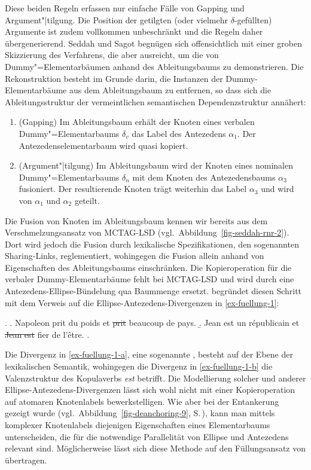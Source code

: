 Diese beiden Regeln erfassen nur einfache Fälle von Gapping und Argument"|tilgung. Die Position der getilgten (oder vielmehr $\delta$-gefüllten) Argumente ist zudem vollkommen unbeschränkt und die Regeln daher übergenerierend. Seddah und Sagot begnügen sich offensichtlich mit einer groben Skizzierung des Verfahrens, die aber ausreicht, um die  von Dummy"=Elementarbäumen anhand des Ableitungsbaums zu demonstrieren. Die Rekonstruktion besteht im Grunde darin, die Instanzen der Dummy-Elementarbäume aus dem Ableitungsbaum zu entfernen, so dass sich die Ableitungsstruktur der vermeintlichen semantischen Dependenzstruktur annähert:\newpage
\begin{enumerate}
  \item (Gapping) Im Ableitungsbaum erhält der Knoten eines verbalen Dummy"=Elementarbaums $\delta_v$ das Label des Antezedens $\alpha_1$. Der Antezedenselementarbaum wird quasi kopiert.
  \item (Argument"|tilgung) Im Ableitungsbaum wird der Knoten eines nominalen Dummy"=Elementarbaums $\delta_n$ mit dem Knoten des Antezedensbaums $\alpha_3$ fusioniert. Der resultierende Knoten trägt weiterhin das Label $\alpha_3$ und wird von $\alpha_1$ und $\alpha_2$ geteilt.
\end{enumerate}
Die Fusion von Knoten im Ableitungsbaum kennen wir bereits aus dem Verschmelzungsansatz von MCTAG-LSD (vgl.\ Abbildung~\ref{fig-seddah-rnr-2}). Dort wird jedoch die Fusion durch lexikalische Spezifikationen, den sogenannten Sharing-Links, reglementiert, wohingegen \cite{Seddah:Sagot:06} die Fusion allein anhand von Eigenschaften des Ableitungsbaums einschränken. Die Kopieroperation für die  verbaler Dummy-Elementarbäume fehlt bei MCTAG-LSD und wird durch eine Antezedens-Ellipse-Bündelung qua Baummenge ersetzt. \cite{Seddah:08} begründet diesen Schritt mit dem Verweis auf die Ellipse-Antezedens-Divergenzen in \ref{ex-fuellung-1}: 

\ex. \label{ex-fuellung-1}
\a. Napoleon prit du poids et \sout{prit} beaucoup de pays. \label{ex-fuellung-1-a}
\b. Jean est un r\'epublicain et \sout{Jean est} fier de l'\^{e}tre. \label{ex-fuellung-1-b} 
\z. \citep[Abbildung~1]{Seddah:08}

Die Divergenz in \ref{ex-fuellung-1-a}, eine sogenannte , besteht auf der Ebene der lexikalischen Semantik, wohingegen die Divergenz in \ref{ex-fuellung-1-b} die Valenzstruktur des Kopulaverbs {\it est} betrifft. Die Modellierung solcher und anderer Ellipse-Antezedens-Divergenzen lässt sich wohl nicht mit einer Kopieroperation auf atomaren Knotenlabels bewerkstelligen. Wie aber bei der Entankerung gezeigt wurde (vgl.\ Abbildung~\ref{fig-deanchoring-9}, S.\,\pageref{fig-deanchoring-9}), kann man mittels komplexer Knotenlabels diejenigen Eigenschaften eines Elementarbaums unterscheiden, die für die notwendige Parallelität von Ellipse und Antezedens relevant sind. Möglicherweise lässt sich diese Methode auf den Füllungsansatz von \cite{Seddah:Sagot:06} übertragen.

